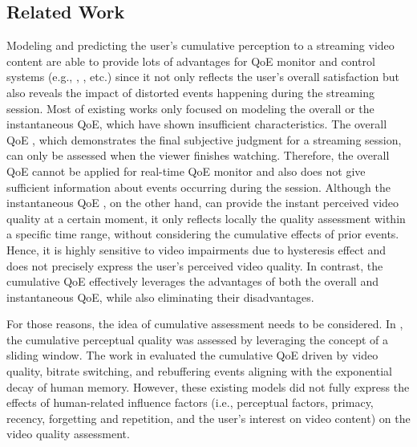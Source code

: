 \subsection{Related Work}

Modeling and predicting the user's cumulative perception to a streaming video content are able to provide lots of advantages for QoE monitor and control systems (e.g., \cite{QoEMonitor1}, \cite{QoEMonitor3}, etc.) since it not only reflects the user's overall satisfaction but also reveals the impact of distorted events happening during the streaming session. Most of existing works only focused on modeling the overall or the instantaneous QoE, which have shown insufficient characteristics. The overall QoE \cite{QoEModel_OP_EstimatingQoE, QoEModel_OP_DerivingValidatingUserExperience, QoEModel_OP_VideoQualityMetric, QoEMonitor2}, which demonstrates the final subjective judgment for a streaming session, can only be assessed when the viewer finishes watching. Therefore, the overall QoE cannot be applied for real-time QoE monitor and also does not give sufficient information about events occurring during the session. Although the instantaneous QoE \cite{QoEModel_IP_TimeVaryingSubjectiveQuality, QoeModel_IP_ShortLongTermQualityModel, QoEModel_BiLSTM}, on the other hand, can provide the instant perceived video quality at a certain moment, it only reflects locally the quality assessment within a specific time range, without considering the cumulative effects of prior events. Hence, it is highly sensitive to video impairments due to hysteresis effect \cite{TemporalHysteresisModel, StallingEvents} and does not precisely express the user's perceived video quality. In contrast, the cumulative QoE effectively leverages the advantages of both the overall and instantaneous QoE, while also eliminating their disadvantages.
 
For those reasons, the idea of cumulative assessment needs to be considered. In \cite{CumulativeQuaityModel}, the cumulative perceptual quality was assessed by leveraging the concept of a sliding window. The work in \cite{CumulativeQoE_Assessing} evaluated the cumulative QoE driven by video quality, bitrate switching, and rebuffering events aligning with the exponential decay of human memory. However, these existing models did not fully express the effects of human-related influence factors (i.e., perceptual factors, primacy, recency, forgetting and repetition, and the user's interest on video content) on the video quality assessment. 

